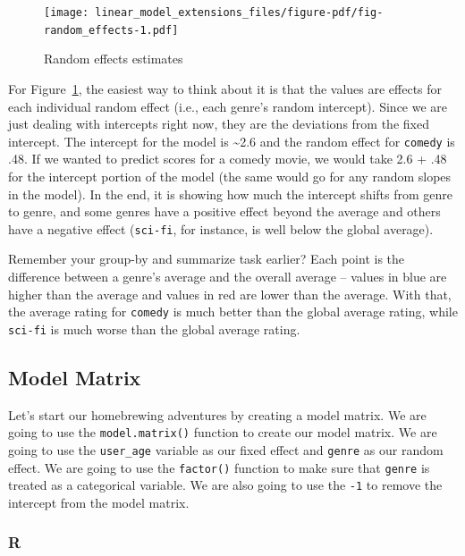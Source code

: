 \documentclass[
  letterpaper,
]{krantz}
\begin{document}
\begin{figure}

{\centering \texttt{[image: linear\_model\_extensions\_files/figure-pdf/fig-random\_effects-1.pdf]}

}

\caption{\label{fig-random_effects}Random effects estimates}

\end{figure}

For Figure~\ref{fig-random_effects}, the easiest way to think about it
is that the values are effects for each individual random effect (i.e.,
each genre's random intercept). Since we are just dealing with
intercepts right now, they are the deviations from the fixed intercept.
The intercept for the model is \textasciitilde2.6 and the random effect
for \texttt{comedy} is .48. If we wanted to predict scores for a comedy
movie, we would take 2.6 + .48 for the intercept portion of the model
(the same would go for any random slopes in the model). In the end, it
is showing how much the intercept shifts from genre to genre, and some
genres have a positive effect beyond the average and others have a
negative effect (\texttt{sci-fi}, for instance, is well below the global
average).

Remember your group-by and summarize task earlier? Each point is the
difference between a genre's average and the overall average -- values
in blue are higher than the average and values in red are lower than the
average. With that, the average rating for \texttt{comedy} is much
better than the global average rating, while \texttt{sci-fi} is much
worse than the global average rating.

\subsection{Model Matrix}\label{model-matrix}

Let's start our homebrewing adventures by creating a model matrix. We
are going to use the \texttt{model.matrix()} function to create our
model matrix. We are going to use the \texttt{user\_age} variable as our
fixed effect and \texttt{genre} as our random effect. We are going to
use the \texttt{factor()} function to make sure that \texttt{genre} is
treated as a categorical variable. We are also going to use the
\texttt{-1} to remove the intercept from the model matrix.

\subsubsection{R}
\end{document}
